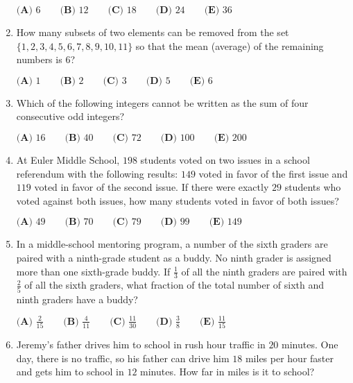 \documentclass{article}
\begin{document}
\begin{enumerate}[label=\arabic*., itemsep=0.5em]
\(\textbf{(A) }6 \qquad\textbf{(B) }12 \qquad\textbf{(C) } 18 \qquad\textbf{(D) } 24 \qquad \textbf{(E) } 36\)\par \vspace{0.5em}\item How many subsets of two elements can be removed from the set \(\{1, 2, 3, 4, 5, 6, 7, 8, 9, 10, 11\}\) so that the mean (average) of the remaining numbers is \(6\)?

\(\textbf{(A)}\text{ 1}\qquad\textbf{(B)}\text{ 2}\qquad\textbf{(C)}\text{ 3}\qquad\textbf{(D)}\text{ 5}\qquad\textbf{(E)}\text{ 6}\)\par \vspace{0.5em}\item Which of the following integers cannot be written as the sum of four consecutive odd integers?

\(\textbf{(A)}\text{ 16}\qquad\textbf{(B)}\text{ 40}\qquad\textbf{(C)}\text{ 72}\qquad\textbf{(D)}\text{ 100}\qquad\textbf{(E)}\text{ 200}\)\par \vspace{0.5em}\item At Euler Middle School, \(198\) students voted on two issues in a school referendum with the following results: \(149\) voted in favor of the first issue and \(119\) voted in favor of the second issue. If there were exactly \(29\) students who voted against both issues, how many students voted in favor of both issues?

\(\textbf{(A) }49\qquad\textbf{(B) }70\qquad\textbf{(C) }79\qquad\textbf{(D) }99\qquad \textbf{(E) }149\)\par \vspace{0.5em}\item In a middle-school mentoring program, a number of the sixth graders are paired with a ninth-grade student as a buddy. No ninth grader is assigned more than one sixth-grade buddy. If \(\tfrac{1}{3}\) of all the ninth graders are paired with \(\tfrac{2}{5}\) of all the sixth graders, what fraction of the total number of sixth and ninth graders have a buddy?

\(
\textbf{(A) } \frac{2}{15} \qquad
\textbf{(B) } \frac{4}{11} \qquad
\textbf{(C) } \frac{11}{30} \qquad
\textbf{(D) } \frac{3}{8} \qquad
\textbf{(E) } \frac{11}{15}
\)\par \vspace{0.5em}\item Jeremy's father drives him to school in rush hour traffic in \(20\) minutes. One day, there is no traffic, so his father can drive him \(18\) miles per hour faster and gets him to school in \(12\) minutes. How far in miles is it to school?


\end{enumerate}
\end{document}
